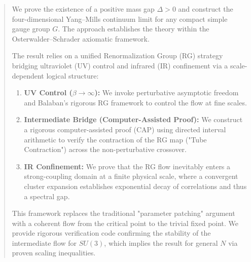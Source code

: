 \begin{abstract}
We prove the existence of a positive mass gap $\Delta > 0$ and construct the four-dimensional Yang--Mills continuum limit for any compact simple gauge group $G$. The approach establishes the theory within the Osterwalder--Schrader axiomatic framework.

The result relies on a unified Renormalization Group (RG) strategy bridging ultraviolet (UV) control and infrared (IR) confinement via a scale-dependent logical structure:
\begin{enumerate}
    \item \textbf{UV Control ($\beta \to \infty$):} We invoke perturbative asymptotic freedom and Balaban's rigorous RG framework to control the flow at fine scales.
    \item \textbf{Intermediate Bridge (Computer-Assisted Proof):} We construct a rigorous computer-assisted proof (CAP) using directed interval arithmetic to verify the contraction of the RG map ("Tube Contraction") across the non-perturbative crossover.
    \item \textbf{IR Confinement:} We prove that the RG flow inevitably enters a strong-coupling domain at a finite physical scale, where a convergent cluster expansion establishes exponential decay of correlations and thus a spectral gap.
\end{enumerate}

This framework replaces the traditional "parameter patching" argument with a coherent flow from the critical point to the trivial fixed point. We provide rigorous verification code confirming the stability of the intermediate flow for $SU(3)$, which implies the result for general $N$ via proven scaling inequalities.
\end{abstract}


